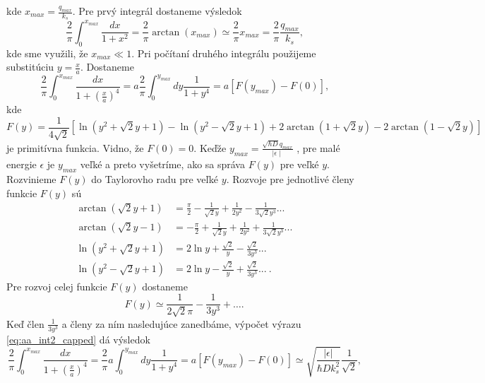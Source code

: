 kde $x_{max}=\frac{q_{max}}{k_s}$. Pre prvý integrál dostaneme výsledok
\begin{equation}
 \label{eq:aa_int1}
 \frac{2}{\pi}\int_0^{x_{max}}\frac{dx}{1+x^2}= \frac{2}{\pi}\arctan{(x_{max})} \simeq  \frac{2}{\pi}x_{max}  = \frac{2}{\pi}\frac{q_{max}}{k_s} \text{,}
\end{equation}
kde sme využili, že $x_{max} \ll 1$. Pri počítaní druhého integrálu použijeme  substitúciu $y=\frac{x}{a}$. Dostaneme
\begin{equation}
 \label{eq:aa_int2_capped}
 \frac{2}{\pi}\int_0^{x_{max}}\frac{dx}{1+(\frac{x}{a})^4} = a\frac{2}{\pi}\int_0^{y_{max}} dy \frac{1}{1+y^4}=a\left[F(y_{max})-F(0)\right]\text{,}
\end{equation}
kde
\begin{equation}
 \label{eq:aa_primitive_func}
 F(y)=\frac{1}{4\sqrt 2}[ \ln(y^2+\sqrt 2 y+1)-\ln(y^2-\sqrt 2 y+1) + 2\arctan(1+\sqrt 2 y ) - 2\arctan(1-\sqrt 2 y)]\text{}
\end{equation}
je primitívna funkcia.
Vidno, že $F(0)=0$.
Keďže $y_{max}=  \frac{\sqrt{\hbar D} q_{max}}{\mid \epsilon \mid}$ , pre malé energie $\epsilon $ je $y_{max}$ veľké a preto vyšetríme, ako sa správa $F(y)$
pre veľké $y$. Rozvinieme $F(y)$ do Taylorovho radu pre veľké $y$. Rozvoje pre jednotlivé členy funkcie $F(y)$ sú
\begin{align*}
 \arctan(\sqrt 2 y+1)&=\frac{\pi}{2}-\frac{1}{\sqrt 2 y}+\frac{1}{2 y^2}-\frac{1}{3 \sqrt 2 y^3} ... \\
 \arctan(\sqrt 2 y -1)&= -\frac{\pi}{2}+\frac{1}{\sqrt 2 y}+\frac{1}{2 y^2}+\frac{1}{3 \sqrt 2 y^3} ...\\
 \ln(y^2+\sqrt 2 y+1)&=  2 \ln y + \frac{\sqrt 2} {y}-\frac{\sqrt 2}{3y^3} ...\\
 \ln(y^2-\sqrt 2 y+1)&= 2 \ln y - \frac{\sqrt 2} {y}+\frac{\sqrt 2}{3y^3}...\ \text{.}
\end{align*}
Pre rozvoj celej funkcie $F(y)$ dostaneme
\begin{equation}
 \label{eq:aa_primitive_func_taylor}
F(y)\simeq \frac{1}{2\sqrt2\pi} - \frac{1}{3y^3} + \dots \text{.}
\end{equation}
Keď  člen $\frac{1}{3y^3}$ a členy za ním nasledujúce zanedbáme,
výpočet výrazu \eqref{eq:aa_int2_capped}  dá výsledok
\begin{equation}
 \label{eq:aa_int2_capped_final}
 \frac{2}{\pi}\int_0^{x_{max}}\frac{dx}{1+(\frac{x}{a})^4} = \frac{2}{\pi}a\int_0^{y_{max}} dy \frac{1}{1+y^4}=a\left[F(y_{max})-F(0)\right]
  \simeq
  \sqrt{\frac{|\epsilon|}{\hbar D k_s^2}} \frac{1}{\sqrt{2}}\text{,}
\end{equation}
